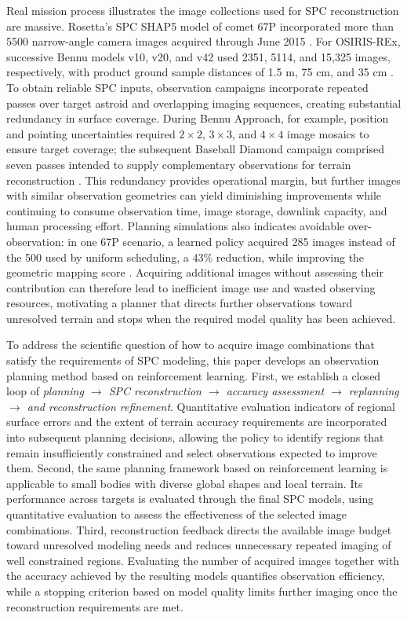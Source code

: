 Real mission process illustrates the image collections used for SPC reconstruction are massive. Rosetta's SPC SHAP5 model of comet 67P incorporated more than 5500 narrow-angle camera images acquired through June 2015 \citep{preusker2017}. For OSIRIS-REx, successive Bennu models v10, v20, and v42 used 2351, 5114, and 15,325 images, respectively, with product ground sample distances of 1.5 m, 75 cm, and 35 cm \citep{palmer2022}. To obtain reliable SPC inputs, observation campaigns incorporate repeated passes over target astroid and overlapping imaging sequences, creating substantial redundancy in surface coverage. During Bennu Approach, for example, position and pointing uncertainties required $2\times2$, $3\times3$, and $4\times4$ image mosaics to ensure target coverage; the subsequent Baseball Diamond campaign comprised seven passes intended to supply complementary observations for terrain reconstruction \citep{palmer2022}. This redundancy provides operational margin, but further images with similar observation geometries can yield diminishing improvements while continuing to consume observation time, image storage, downlink capacity, and human processing effort. Planning simulations also indicates avoidable over-observation: in one 67P scenario, a learned policy acquired 285 images instead of the 500 used by uniform scheduling, a 43\% reduction, while improving the geometric mapping score \citep{piccinin2022}. Acquiring additional images without assessing their contribution can therefore lead to inefficient image use and wasted observing resources, motivating a planner that directs further observations toward unresolved terrain and stops when the required model quality has been achieved.

To address the scientific question of how to acquire image combinations that satisfy the requirements of SPC modeling, this paper develops an observation planning method based on reinforcement learning. First, we establish a closed loop of \emph{planning $\rightarrow$ SPC reconstruction $\rightarrow$ accuracy assessment $\rightarrow$ replanning $\rightarrow$ and reconstruction refinement}. Quantitative evaluation indicators of regional surface errors and the extent of terrain accuracy requirements are incorporated into subsequent planning decisions, allowing the policy to identify regions that remain insufficiently constrained and select observations expected to improve them. Second, the same planning framework based on reinforcement learning is applicable to small bodies with diverse global shapes and local terrain. Its performance across targets is evaluated through the final SPC models, using quantitative evaluation to assess the effectiveness of the selected image combinations. Third, reconstruction feedback directs the available image budget toward unresolved modeling needs and reduces unnecessary repeated imaging of well constrained regions. Evaluating the number of acquired images together with the accuracy achieved by the resulting models quantifies observation efficiency, while a stopping criterion based on model quality limits further imaging once the reconstruction requirements are met.
